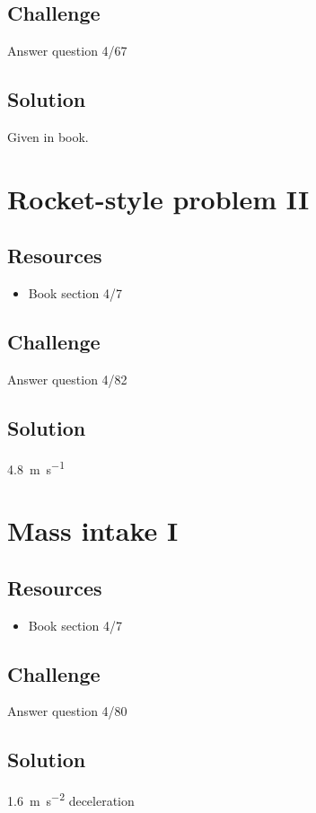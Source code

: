 \subsection*{Challenge}
Answer question 4/67

\subsection*{Solution}
Given in book.




\newpage
\section{Rocket-style problem II}

\subsection*{Resources}
\begin{itemize}
    \item Book section 4/7
\end{itemize}

\subsection*{Challenge}
Answer question 4/82

\subsection*{Solution}
\SI{4.8}{\meter\per\second}




\newpage
\section{Mass intake I}

\subsection*{Resources}
\begin{itemize}
    \item Book section 4/7
\end{itemize}

\subsection*{Challenge}
Answer question 4/80

\subsection*{Solution}
\SI{1.6}{\meter\per\square\second} deceleration




